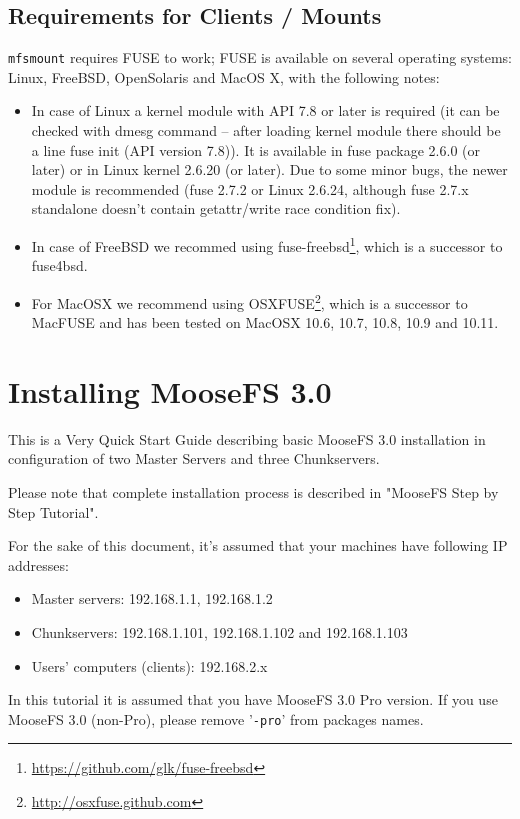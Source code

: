 \documentclass[a4paper,11pt,english]{report}
\def\code#1{\texttt{#1}}
\begin{document}
		\section{Requirements for Clients / Mounts}
		\code{mfsmount} requires FUSE to work; FUSE is available on several operating systems: Linux, FreeBSD, OpenSolaris and MacOS X, with the following notes:
		
		\begin{itemize}
			\item In case of Linux a kernel module with API 7.8 or later is required (it can be checked with dmesg command -- after loading kernel module there should be a line fuse init (API version 7.8)). It is available in fuse package 2.6.0 (or later) or in Linux kernel 2.6.20 (or later). Due to some minor bugs, the newer module is recommended (fuse 2.7.2 or Linux 2.6.24, although fuse 2.7.x standalone doesn't contain getattr/write race condition fix).
			\item In case of FreeBSD we recommed using fuse-freebsd\footnote{\url{https://github.com/glk/fuse-freebsd}}, which is a successor to fuse4bsd.
			\item For MacOSX we recommend using OSXFUSE\footnote{\url{http://osxfuse.github.com}}, which is a successor to MacFUSE and has been tested on MacOSX 10.6, 10.7, 10.8, 10.9 and 10.11.
		\end{itemize}




	\chapter{Installing MooseFS 3.0}
	This is a Very Quick Start Guide describing basic MooseFS 3.0 installation in configuration of two Master Servers and three Chunkservers.
	
	Please note that complete installation process is described in "MooseFS Step by Step Tutorial".
	
	For the sake of this document, it's assumed that your machines have following IP addresses:
	\begin{itemize}
		\item Master servers: 192.168.1.1, 192.168.1.2
		\item Chunkservers: 192.168.1.101, 192.168.1.102 and 192.168.1.103
		\item Users' computers (clients): 192.168.2.x
	\end{itemize}

	In this tutorial it is assumed that you have MooseFS 3.0 Pro version. If you use MooseFS 3.0 (non-Pro), please remove '\code{-pro}' from packages names.
	
\end{document}
